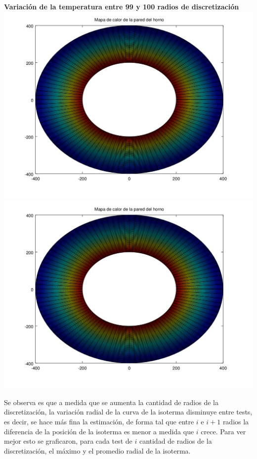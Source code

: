 \begin{enumerate}
	\textbf{Variación de la temperatura entre 99 y 100 radios de discretización}\\
	\includegraphics[scale=0.35]{experimentos1a_1b/evolucion_posicion_isoterma_temperatura/test2/test6_099_radios_inst_001_heatmap.png}
	\includegraphics[scale=0.35]{experimentos1a_1b/evolucion_posicion_isoterma_temperatura/test2/test6_100_radios_inst_001_heatmap.png}

\vspace{0.5cm}

Se observa es que a medida que se aumenta la cantidad de radios de la discretización, la variación radial de la curva de la isoterma disminuye entre tests, es decir, se hace más fina la estimación, de forma tal que entre $i$ e $i+1$ radios la diferencia de la posición de la isoterma es menor a medida que $i$ crece. Para ver mejor esto se graficaron, para cada test de $i$ cantidad de radios de la discretización, el máximo y el promedio radial de la isoterma.


\end{enumerate}
